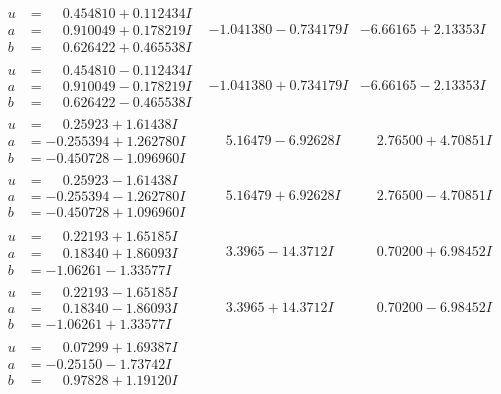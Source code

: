 \documentclass[1p]{elsarticle_modified}
\theoremstyle{definition}
\begin{document}
$$\begin{array}{c|c|c}
\begin{aligned}
u &= \phantom{-}0.454810 + 0.112434 I \\
a &= \phantom{-}0.910049 + 0.178219 I \\
b &= \phantom{-}0.626422 + 0.465538 I\end{aligned}
 & -1.041380 - 0.734179 I & -6.66165 + 2.13353 I \\ \hline\begin{aligned}
u &= \phantom{-}0.454810 - 0.112434 I \\
a &= \phantom{-}0.910049 - 0.178219 I \\
b &= \phantom{-}0.626422 - 0.465538 I\end{aligned}
 & -1.041380 + 0.734179 I & -6.66165 - 2.13353 I \\ \hline\begin{aligned}
u &= \phantom{-}0.25923 + 1.61438 I \\
a &= -0.255394 + 1.262780 I \\
b &= -0.450728 - 1.096960 I\end{aligned}
 & \phantom{-}5.16479 - 6.92628 I & \phantom{-}2.76500 + 4.70851 I \\ \hline\begin{aligned}
u &= \phantom{-}0.25923 - 1.61438 I \\
a &= -0.255394 - 1.262780 I \\
b &= -0.450728 + 1.096960 I\end{aligned}
 & \phantom{-}5.16479 + 6.92628 I & \phantom{-}2.76500 - 4.70851 I \\ \hline\begin{aligned}
u &= \phantom{-}0.22193 + 1.65185 I \\
a &= \phantom{-}0.18340 + 1.86093 I \\
b &= -1.06261 - 1.33577 I\end{aligned}
 & \phantom{-}3.3965 - 14.3712 I & \phantom{-}0.70200 + 6.98452 I \\ \hline\begin{aligned}
u &= \phantom{-}0.22193 - 1.65185 I \\
a &= \phantom{-}0.18340 - 1.86093 I \\
b &= -1.06261 + 1.33577 I\end{aligned}
 & \phantom{-}3.3965 + 14.3712 I & \phantom{-}0.70200 - 6.98452 I \\ \hline\begin{aligned}
u &= \phantom{-}0.07299 + 1.69387 I \\
a &= -0.25150 - 1.73742 I \\
b &= \phantom{-}0.97828 + 1.19120 I\end{aligned}

\end{array}$$
\end{document}
